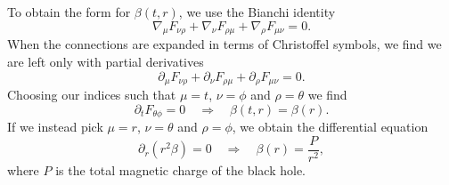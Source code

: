 To obtain the form for $\beta(t,r)$, we use the Bianchi identity
\begin{equation*}
   \nabla_{\mu} F_{\nu \rho} + \nabla_{\nu} F_{\rho \mu} +\nabla_{\rho} F_{\mu \nu} = 0.
\end{equation*}
When the connections are expanded in terms of Christoffel symbols, we find we are left only with partial derivatives
\begin{equation*}
   \partial_{\mu} F_{\nu \rho} + \partial_{\nu} F_{\rho \mu} +\partial_{\rho} F_{\mu \nu} = 0.
\end{equation*}
Choosing our indices such that $\mu = t$, $\nu = \phi$ and $\rho = \theta$ we find
\begin{equation*}
   \partial_t F_{\theta \phi} = 0 \quad \Rightarrow \quad \beta(t,r) = \beta(r).
\end{equation*}
If we instead pick $\mu = r$, $\nu = \theta$ and $\rho = \phi$, we obtain the differential equation
\begin{equation*}
    \partial_r (r^2 \beta) = 0 \quad \Rightarrow \quad \beta(r) = \frac{P}{r^2},
\end{equation*}
where $P$ is the total magnetic charge of the black hole.
 
